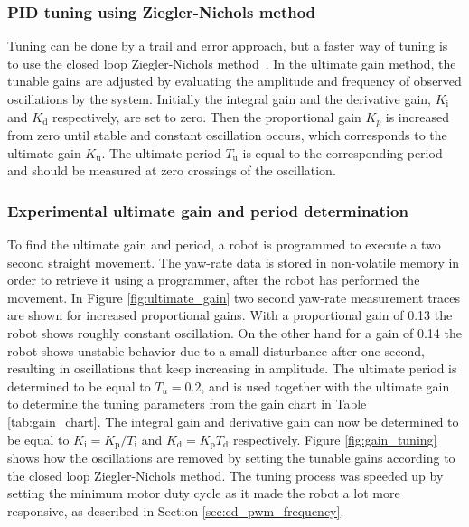\subsubsection{PID tuning using Ziegler-Nichols method}

Tuning can be done by a trail and error approach, but a faster way of tuning is to use the closed loop Ziegler-Nichols method~\cite{franklin_feedback_2015}.
In the ultimate gain method, the tunable gains are adjusted by evaluating the amplitude and frequency of observed oscillations by the system.
Initially the integral gain and the derivative gain, $K_{\text{i}}$ and $K_{\text{d}}$ respectively, are set to zero.
Then the proportional gain $K_{p}$ is increased from zero until stable and constant oscillation occurs, which corresponds to the ultimate gain $K_{\text{u}}$.
The ultimate period $T_{\text{u}}$ is equal to the corresponding period and should be measured at zero crossings of the oscillation.

\subsubsection{Experimental ultimate gain and period determination}

To find the ultimate gain and period, a robot is programmed to execute a two second straight movement.
The yaw-rate data is stored in non-volatile memory in order to retrieve it using a programmer, after the robot has performed the movement.
In Figure \ref{fig:ultimate_gain} two second yaw-rate measurement traces are shown for increased proportional gains.
With a proportional gain of 0.13 the robot shows roughly constant oscillation.
On the other hand for a gain of 0.14 the robot shows unstable behavior due to a small disturbance after one second, resulting in oscillations that keep increasing in amplitude.
The ultimate period is determined to be equal to $T_{u} = 0.2$, and is used together with the ultimate gain to determine the tuning parameters from the gain chart in Table \ref{tab:gain_chart}.
The integral gain and derivative gain can now be determined to be equal to $K_{\text{i}}  = K_{\text{p}} / T_{\text{i}}$ and $K_{\text{d}}  = K_{\text{p}}T_{\text{d}}$ respectively.
Figure \ref{fig:gain_tuning} shows how the oscillations are removed by setting the tunable gains according to the closed loop Ziegler-Nichols method.
The tuning process was speeded up by setting the minimum motor duty cycle as it made the robot a lot more responsive, as described in Section \ref{sec:cd_pwm_frequency}.

